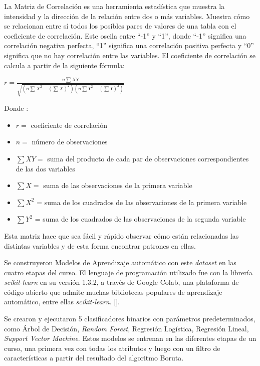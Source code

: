 La Matriz de Correlación es una herramienta estadística que muestra la intensidad y la dirección de la relación entre dos o más variables. Muestra cómo se relacionan entre sí todos los posibles 
pares de valores de una tabla con el coeficiente de correlación. Este oscila entre ``-1'' y ``1'', donde ``-1'' significa una correlación negativa perfecta, \newline
``1'' significa una correlación positiva perfecta y ``0'' significa que no hay correlación entre las variables. El coeficiente de correlación se calcula a partir de la siguiente fórmula: 

\begin{center}
    $r = \frac{n\sum{XY}}{\sqrt{(n\sum{X^2}-(\sum{X})^2)(n\sum{Y^2} - (\sum{Y})^2)}}$
\end{center}

Donde : 

\begin{itemize}
    \item $r =$ coeficiente de correlación
    \item $n =$ número de observaciones
    \item $\sum{XY} =$ suma del producto de cada par de observaciones correspondientes de las dos variables
    \item $\sum{X} =$ suma de las observaciones de la primera variable
    \item $\sum{X^2}$ = suma de los cuadrados de las observaciones de la primera variable
    \item $\sum{Y^2}$ = suma de los cuadrados de las observaciones de la segunda variable  
\end{itemize}

Esta matriz hace que sea fácil y rápido observar cómo están relacionadas las distintas variables y de esta forma encontrar patrones en ellas.  

Se construyeron Modelos de Aprendizaje automático con este \textit{dataset} en las cuatro etapas del curso. El lenguaje de programación utilizado fue con la librería \textit{scikit-learn} en su versión 1.3.2, a través de Google Colab, una plataforma 
de código abierto que admite muchas bibliotecas populares de aprendizaje automático, entre ellas \textit{scikit-learn}. [\cite{wei-meng2019python}].  

Se crearon y ejecutaron 5 clasificadores binarios con parámetros predeterminados, como Árbol de Decisión, \textit{Random Forest}, 
Regresión Logística, Regresión Lineal, \textit{Support Vector Machine}. Estos modelos se entrenan en las diferentes etapas de un curso, una primera vez con todas los 
atributos y luego con un filtro de características a partir del resultado del algoritmo Boruta.


